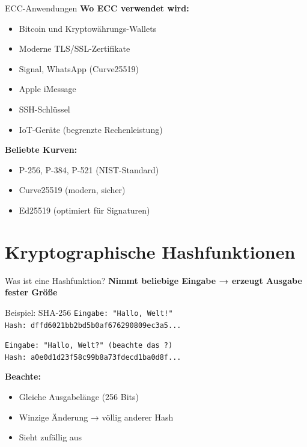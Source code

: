 \documentclass[handout]{beamer}
\begin{document}
\begin{frame}{ECC-Anwendungen}
\textbf{Wo ECC verwendet wird:}
\begin{itemize}
    \item Bitcoin und Kryptowährungs-Wallets
    \item Moderne TLS/SSL-Zertifikate
    \item Signal, WhatsApp (Curve25519)
    \item Apple iMessage
    \item SSH-Schlüssel
    \item IoT-Geräte (begrenzte Rechenleistung)
\end{itemize}

\vspace{0.3cm}
\textbf{Beliebte Kurven:}
\begin{itemize}
    \item P-256, P-384, P-521 (NIST-Standard)
    \item Curve25519 (modern, sicher)
    \item Ed25519 (optimiert für Signaturen)
\end{itemize}
\end{frame}

\section{Kryptographische Hashfunktionen}

\begin{frame}[fragile]{Was ist eine Hashfunktion?}
\textbf{Nimmt beliebige Eingabe → erzeugt Ausgabe fester Größe}

\vspace{0.3cm}
\begin{exampleblock}{Beispiel: SHA-256}
\texttt{Eingabe: "Hallo, Welt!"}\\
\texttt{Hash: dffd6021bb2bd5b0af676290809ec3a5...}

\vspace{0.2cm}
\texttt{Eingabe: "Hallo, Welt?" (beachte das ?)}\\
\texttt{Hash: a0e0d1d23f58c99b8a73fdecd1ba0d8f...}
\end{exampleblock}

\vspace{0.3cm}
\textbf{Beachte:}
\begin{itemize}
    \item Gleiche Ausgabelänge (256 Bits)
    \item Winzige Änderung → völlig anderer Hash
    \item Sieht zufällig aus
\end{itemize}

\end{frame}
\end{document}

